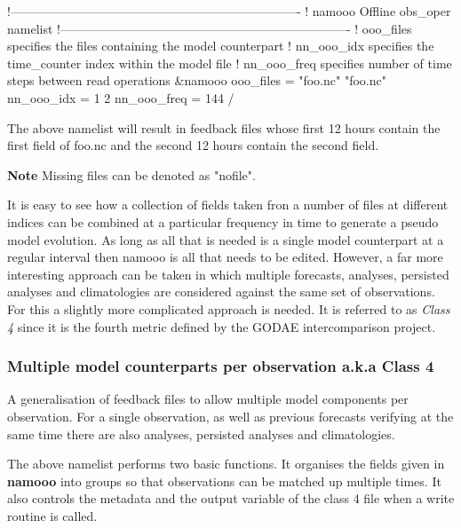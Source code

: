 \documentclass[../main/NEMO_manual]{subfiles}
\begin{document}
\begin{forlines}
!----------------------------------------------------------------------
!       namooo Offline obs_oper namelist
!----------------------------------------------------------------------
!   ooo_files    specifies the files containing the model counterpart
!   nn_ooo_idx   specifies the time_counter index within the model file
!   nn_ooo_freq  specifies number of time steps between read operations
&namooo
   ooo_files = "foo.nc" "foo.nc"
   nn_ooo_idx = 1 2
   nn_ooo_freq = 144
/
\end{forlines}

The above namelist will result in feedback files whose first 12 hours contain the first field of foo.nc and
the second 12 hours contain the second field.

\textbf{Note} Missing files can be denoted as "nofile".

It is easy to see how a collection of fields taken fron a number of files at different indices can be combined at
a particular frequency in time to generate a pseudo model evolution.
As long as all that is needed is a single model counterpart at a regular interval then
namooo is all that needs to be edited.
However, a far more interesting approach can be taken in which multiple forecasts, analyses, persisted analyses and
climatologies are considered against the same set of observations.
For this a slightly more complicated approach is needed.
It is referred to as \emph{Class 4} since it is the fourth metric defined by the GODAE intercomparison project.

\subsubsection{Multiple model counterparts per observation a.k.a Class 4}

A generalisation of feedback files to allow multiple model components per observation.
For a single observation, as well as previous forecasts verifying at the same time
there are also analyses, persisted analyses and climatologies. 


The above namelist performs two basic functions.
It organises the fields given in \textbf{namooo} into groups so that observations can be matched up multiple times.
It also controls the metadata and the output variable of the class 4 file when a write routine is called.
\end{document}
